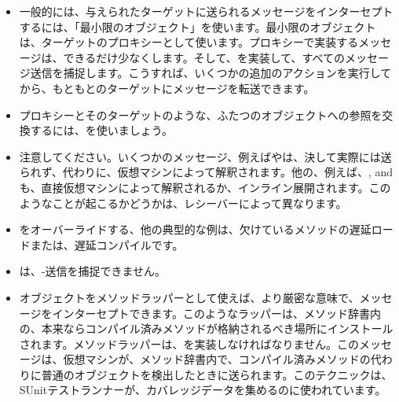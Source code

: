 \documentclass[a4paper,10pt,twoside]{book}
\begin{document}
\begin{itemize}
\item 一般的には、与えられたターゲットに送られるメッセージをインターセプトするには、「最小限のオブジェクト」を使います。最小限のオブジェクトは、ターゲットのプロキシーとして使います。プロキシーで実装するメッセージは、できるだけ少なくします。そして、を実装して、すべてのメッセージ送信を捕捉します。こうすれば、いくつかの追加のアクションを実行してから、もともとのターゲットにメッセージを転送できます。
\item プロキシーとそのターゲットのような、ふたつのオブジェクトへの参照を交換するには、を使いましょう。
\item 注意してください。いくつかのメッセージ、例えばやは、決して実際には送られず、代わりに、仮想マシンによって解釈されます。他の、例えば、\ct{+}, \ct{-} and  も、直接仮想マシンによって解釈されるか、インライン展開されます。このようなことが起こるかどうかは、レシーバーによって異なります。
\item {}をオーバーライドする、他の典型的な例は、欠けているメソッドの遅延ロードまたは、遅延コンパイルです。
\item {}は、\self-送信を捕捉できません。
\item オブジェクトをメソッドラッパーとして使えば、より厳密な意味で、メッセージをインターセプトできます。このようなラッパーは、メソッド辞書内の、本来ならコンパイル済みメソッドが格納されるべき場所にインストールされます。メソッドラッパーは、を実装しなければなりません。このメッセージは、仮想マシンが、メソッド辞書内で、コンパイル済みメソッドの代わりに普通のオブジェクトを検出したときに送られます。このテクニックは、SUnitテストランナーが、カバレッジデータを集めるのに使われています。
\end{itemize}

\ifx\wholebook\relax\else
   
   
\end{document}
